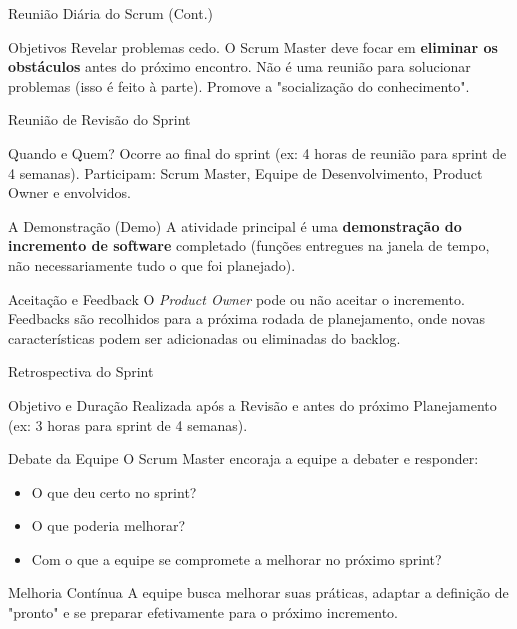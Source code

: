 \documentclass[aspectratio=169, 9pt]{beamer}
\begin{document}
\begin{frame}{Reunião Diária do Scrum (Cont.)}
  \begin{block}{Objetivos}
    Revelar problemas cedo. O Scrum Master deve focar em \textbf{eliminar os obstáculos} antes do próximo encontro. Não é uma reunião para solucionar problemas (isso é feito à parte). Promove a "socialização do conhecimento".
  \end{block}
\end{frame}

\begin{frame}{Reunião de Revisão do Sprint}
  \begin{block}{Quando e Quem?}
    Ocorre ao final do sprint (ex: 4 horas de reunião para sprint de 4 semanas). Participam: Scrum Master, Equipe de Desenvolvimento, Product Owner e envolvidos.
  \end{block}

  \vspace{0.2cm}
  \begin{block}{A Demonstração (Demo)}
    A atividade principal é uma \textbf{demonstração do incremento de software} completado (funções entregues na janela de tempo, não necessariamente tudo o que foi planejado).
  \end{block}

  \vspace{0.2cm}
  \begin{block}{Aceitação e Feedback}
    O \textit{Product Owner} pode ou não aceitar o incremento. Feedbacks são recolhidos para a próxima rodada de planejamento, onde novas características podem ser adicionadas ou eliminadas do backlog.
  \end{block}
\end{frame}

\begin{frame}{Retrospectiva do Sprint}
  \begin{block}{Objetivo e Duração}
    Realizada após a Revisão e antes do próximo Planejamento (ex: 3 horas para sprint de 4 semanas). 
  \end{block}

  \vspace{0.2cm}
  \begin{block}{Debate da Equipe}
    O Scrum Master encoraja a equipe a debater e responder:
    \begin{itemize}
      \item O que deu certo no sprint?
      \item O que poderia melhorar?
      \item Com o que a equipe se compromete a melhorar no próximo sprint?
    \end{itemize}
  \end{block}

  \vspace{0.2cm}
  \begin{block}{Melhoria Contínua}
    A equipe busca melhorar suas práticas, adaptar a definição de "pronto" e se preparar efetivamente para o próximo incremento.
  \end{block}
\end{frame}
\end{document}
